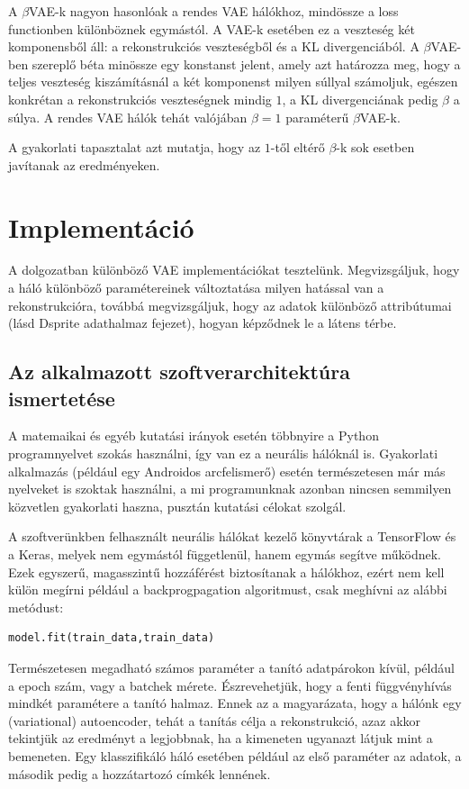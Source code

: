 \documentclass[12pt]{article}
\begin{document}
A $\beta$VAE-k nagyon hasonlóak a rendes VAE hálókhoz, mindössze a loss functionben különböznek egymástól. A VAE-k esetében ez a veszteség két komponensből áll: a rekonstrukciós veszteségből és a KL divergenciából. A $\beta$VAE-ben szereplő béta minössze egy konstanst jelent, amely azt határozza meg, hogy a teljes veszteség kiszámításnál a két komponenst milyen súllyal számoljuk, egészen konkrétan a rekonstrukciós veszteségnek mindig $1$, a KL divergenciának pedig $\beta$ a súlya. A rendes VAE hálók tehát valójában $\beta=1$ paraméterű $\beta$VAE-k.

A gyakorlati tapasztalat azt mutatja, hogy az $1$-től eltérő $\beta$-k sok esetben javítanak az eredményeken.

\section{Implementáció}

A dolgozatban különböző VAE implementációkat tesztelünk. Megvizsgáljuk, hogy a háló különböző paramétereinek változtatása milyen hatással van a rekonstrukcióra, továbbá megvizsgáljuk, hogy az adatok különböző attribútumai (lásd Dsprite adathalmaz fejezet), hogyan képződnek le a látens térbe.

\subsection{Az alkalmazott szoftverarchitektúra ismertetése}

A matemaikai és egyéb kutatási irányok esetén többnyire a Python programnyelvet szokás használni, így van ez a neurális hálóknál is. Gyakorlati alkalmazás (például egy Androidos arcfelismerő) esetén természetesen már más nyelveket is szoktak használni, a mi programunknak azonban nincsen semmilyen közvetlen gyakorlati haszna, pusztán kutatási célokat szolgál.

A szoftverünkben felhasznált neurális hálókat kezelő könyvtárak a TensorFlow és a Keras, melyek nem egymástól függetlenül, hanem egymás segítve működnek. Ezek egyszerű, magasszintű hozzáférést biztosítanak a hálókhoz, ezért nem kell külön megírni például a backprogpagation algoritmust, csak meghívni az alábbi metódust:

\lstset{language=Python}
\begin{lstlisting}
model.fit(train_data,train_data)
\end{lstlisting}

Természetesen megadható számos paraméter a tanító adatpárokon kívül, például a epoch szám, vagy a batchek mérete. Észrevehetjük, hogy a fenti függvényhívás mindkét paramétere a tanító halmaz. Ennek az a magyarázata, hogy a hálónk egy (variational) autoencoder, tehát a tanítás célja a rekonstrukció, azaz akkor tekintjük az eredményt a legjobbnak, ha a kimeneten ugyanazt látjuk mint a bemeneten. Egy klasszifikáló háló esetében például az első paraméter az adatok, a második pedig a hozzátartozó címkék lennének.
\end{document}
